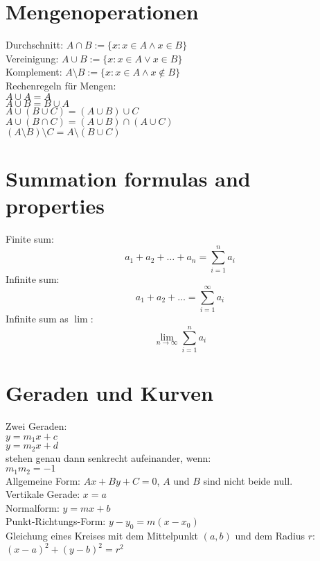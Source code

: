 \documentclass[a4paper, 10pt]{scrartcl}
\begin{document}
\setlength{\parindent}{0em}

\section*{Mengenoperationen}
Durchschnitt: $A\cap B := \{x: x\in A \wedge x\in B\}$\\
Vereinigung: $A\cup B := \{x: x\in A \vee x\in B\}$\\
Komplement: $A\setminus B := \{x: x\in A \wedge x\notin B\}$\\

Rechenregeln für Mengen:\\
$A\cup A = A$\\
$A\cup B = B\cup A$\\
$A\cup (B\cup C) = (A\cup B)\cup C$\\
$A\cup (B\cap C) = (A\cup B)\cap (A\cup C)$\\
$(A\setminus B)\setminus C = A\setminus (B\cup C)$\\

\section*{Summation formulas and properties}
Finite sum:
\[
a_{1} + a_{2} + \dots + a_{n} = \sum_{i=1}^{n}a_{i}
\]
Infinite sum:
\[
a_{1} + a_{2} + \dots = \sum_{i=1}^{\infty}a_{i}
\]
Infinite sum as $\lim$:\\
\[
\lim_{n\to\infty}\sum_{i=1}^{n}a_{i}
\]

\section*{Geraden und Kurven}
Zwei Geraden:\\
$y = m_{1}x + c$\\
$y = m_{2}x + d$\\
stehen genau dann senkrecht aufeinander, wenn:\\
$m_{1}m_{2} = -1$\\

Allgemeine Form: $Ax + By + C = 0$, $A$ und $B$ sind nicht beide null.\\
Vertikale Gerade: $x = a$\\
Normalform: $y = mx + b$\\
Punkt-Richtungs-Form: $y - y_{0} = m(x - x_{0})$\\

Gleichung eines Kreises mit dem Mittelpunkt $(a, b)$
und dem Radius $r$:\\
$(x - a)^{2} + (y - b)^{2} = r^{2}$\\
\end{document}

